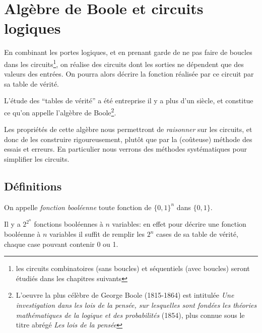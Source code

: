 \chapter{Alg\`ebre de Boole et circuits logiques}

En combinant les portes logiques, et en prenant garde de ne pas faire
de boucles dans les circuits\footnote {les circuits combinatoires
(sans boucles) et s\'equentiels (avec boucles) seront \'etudi\'es dans
les chapitres suivants}, on r\'ealise des circuits dont les sorties ne
d\'ependent que des valeurs des entr\'ees. On pourra alors d\'ecrire
la fonction r\'ealis\'ee par ce circuit par sa table de v\'erit\'e.

L'\'etude des ``tables de v\'erit\'e'' 
a \'et\'e entreprise il y a plus d'un si\`ecle, et constitue ce
qu'on appelle l'alg\`ebre de Boole\footnote{L'oeuvre la plus
c\'el\`ebre de George Boole (1815-1864) est intitul\'ee {\em Une investigation
dans les lois de la pens\'ee, sur lesquelles sont fond\'ees les th\'eories 
math\'ematiques de la logique et des probabilit\'es} (1854), plus connue
sous le titre abr\'eg\'e {\em Les lois de la pens\'ee}}.

Les propri\'et\'es de cette alg\`ebre nous permettront de {\em raisonner}
sur les circuits, et donc de les construire rigoureusement, plut\^ot que
par la (co\^uteuse) m\'ethode des essais et erreurs. En particulier
nous verrons des m\'ethodes syst\'ematiques pour simplifier les circuits.


\section{D\'efinitions}


On appelle {\em fonction bool\'eenne} toute fonction de $\{0,1\}^n$ 
dans $\{0,1\}$.

Il y a $2^{2^n}$ fonctions bool\'eennes \`a $n$ variables: en effet pour 
d\'ecrire une fonction bool\'eenne \`a $n$ variables il suffit de remplir les
$2^n$ cases de sa table de v\'erit\'e, chaque case pouvant contenir 0 ou 1.





